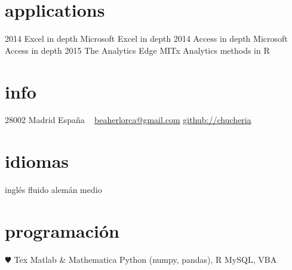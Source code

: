 \documentclass[]{friggeri-cv}
\begin{document}
\section{applications}

\begin{entrylist}
  \entry
    {2014}
    {Excel in depth}
    {}
    {Microsoft Excel in depth}
  \entry
    {2014}
    {Access in depth}
    {}
    {Microsoft Access in depth}
  \entry
    {2015}
    {The Analytics Edge}
    {MITx}
    {Analytics methods in R}
\end{entrylist}




\else 

       {}


\begin{aside}
  \section{info}
    28002 Madrid
    España
    ~
    \href{mailto:beaherlorca@gmail.com}{beaherlorca@gmail.com}
    \href{https://github.com/chucheria}{github://chucheria}
  \section{idiomas}
    inglés fluido
    alemán medio
  \section{programación}
    {\color{red} $\varheartsuit$} Tex
    Matlab \& Mathematica
    Python (numpy, pandas), R
    MySQL, VBA
\end{aside}
\end{document}
